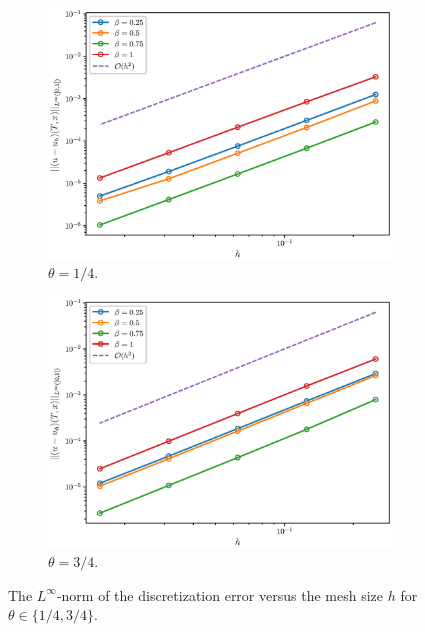 \begin{figure}[h]
\centering
\begin{subfigure}{0.5\textwidth}
  \centering
  \includegraphics[width=1\linewidth]{figures/theta1o4/linf.eps}
  \caption{$\theta=1/4$.}
  \label{fig:sub1}
\end{subfigure}%
\begin{subfigure}{0.5\textwidth}
  \centering
  \includegraphics[width=1\linewidth]{figures/theta3o4/linf.eps}
  \caption{$\theta=3/4$.}
  \label{fig:sub2}
\end{subfigure}
\caption{The $L^{\infty}$-norm of the discretization error versus the mesh size $h$ for $\theta \in \{1/4, 3/4 \}$. }
\label{fig:sub2}
\end{figure}

\newpage


